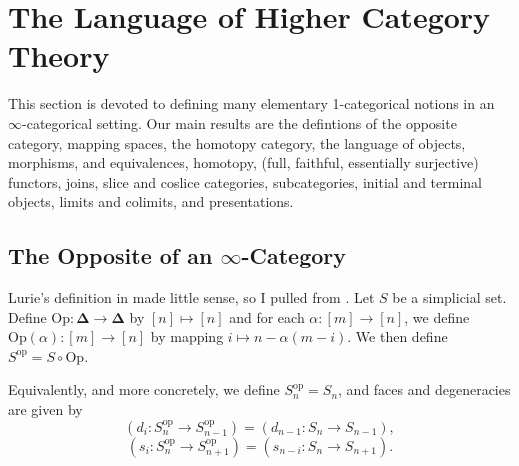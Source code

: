 \section{The Language of Higher Category Theory}\label{sec1.2}

This section is devoted to defining many elementary 1-categorical notions in an $\infty $-categorical setting. Our main results are the defintions of the opposite category, mapping spaces, the homotopy category, the language of objects, morphisms, and equivalences, homotopy, (full, faithful, essentially surjective) functors, joins, slice and coslice categories, subcategories, initial and terminal objects, limits and colimits, and presentations.


\subsection{The Opposite of an $\infty $-Category}

\begin{definition}\label{1.2.1.1}
	Lurie's definition in \cite{htt} made little sense, so I pulled from \cite[003L]{kerodon}. Let $S$ be a simplicial set. Define $\mathrm{Op} : \boldsymbol{\Delta}  \to \boldsymbol{\Delta} $ by $[n]\mapsto [n]$ and for each $\alpha : [m] \to [n]$, we define $\mathrm{Op} (\alpha) : [m] \to [n]$ by mapping $i\mapsto n-\alpha(m-i)$. We then define $S^{\mathrm{op}} =S\circ \mathrm{Op} $.

	Equivalently, and more concretely, we define $S^{\mathrm{op}} _n=S_n$, and faces and degeneracies are given by
	\[
		(d_i : S^{\mathrm{op}} _n \to S^{\mathrm{op}} _{n-1} ) = (d_{n-1} : S_n \to S_{n-1} ),
	\]
	\[
		(s_i : S^{\mathrm{op}} _n \to S^{\mathrm{op}}_{n+1} ) = (s_{n-i} : S_n \to S_{n+1} )
	.\]
\end{definition}

